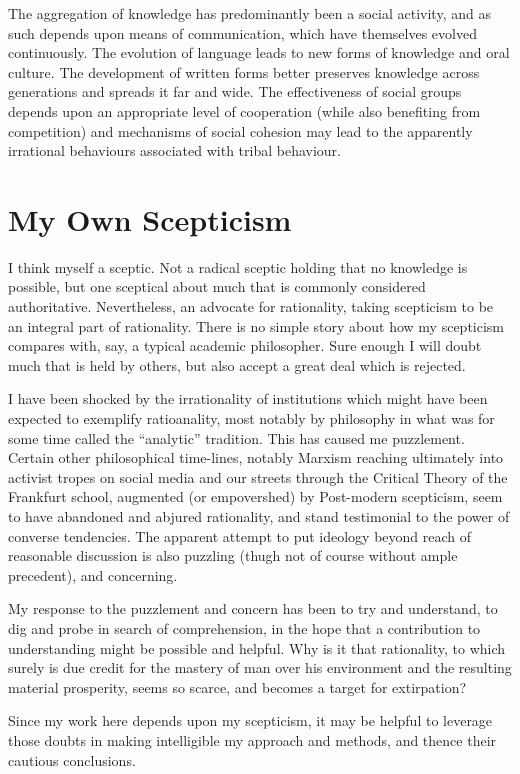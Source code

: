\documentclass[10pt,titlepage]{book}
\begin{document}
The aggregation of knowledge has predominantly been a social activity, and as such depends upon means of communication, which have themselves evolved continuously.
The evolution of language leads to new forms of knowledge and oral culture.
The development of written forms better preserves knowledge across generations and spreads it far and wide.
The effectiveness of social groups depends upon an appropriate level of cooperation (while also benefiting from competition) and mechanisms of social cohesion may lead to the apparently irrational behaviours associated with tribal behaviour.

\section{My Own Scepticism}

I think myself a sceptic.
Not a radical sceptic holding that no knowledge is possible, but one sceptical about much that is commonly considered authoritative.
Nevertheless, an advocate for rationality, taking scepticism to be an integral part of rationality.
There is no simple story about how my scepticism compares with, say, a typical academic philosopher.
Sure enough I will doubt much that is held by others, but also accept a great deal which is rejected.

I have been shocked by the irrationality of institutions which might have been expected to exemplify ratioanality, most notably by philosophy in what was for some time called the ``analytic'' tradition.
This has caused me puzzlement.
Certain other philosophical time-lines, notably Marxism reaching ultimately into activist tropes on social media and our streets through the Critical Theory of the Frankfurt school, augmented (or empovershed) by Post-modern scepticism, seem to have abandoned and abjured rationality, and stand testimonial to the power of converse tendencies.
The apparent attempt to put ideology beyond reach of reasonable discussion is also puzzling (thugh not of course without ample precedent), and concerning.

My response to the puzzlement and concern has been to try and understand, to dig and probe in search of comprehension, in the hope that a contribution to understanding might be possible and helpful.
Why is it that rationality, to which surely is due credit for the mastery of man over his environment and the resulting material prosperity, seems so scarce, and becomes a target for extirpation?

Since my work here depends upon my scepticism, it may be helpful to leverage those doubts in making intelligible my approach and methods, and thence their cautious conclusions.
\end{document}
